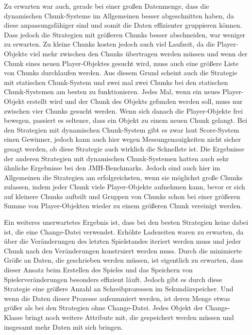 Zu erwarten war auch, gerade bei einer großen Datenmenge, dass die dynamischen Chunk-Systeme im Allgemeinen besser abgeschnitten haben, da diese anpassungsfähiger sind und somit die Daten effizienter gruppieren können. Dass jedoch die Strategien mit größeren Chunks besser abschneiden, war weniger zu erwarten. Zu kleine Chunks kosten jedoch auch viel Laufzeit, da die Player-Objekte viel mehr zwischen den Chunks übertragen werden müssen und wenn der Chunk eines neuen Player-Objektes gesucht wird, muss auch eine größere Liste von Chunks durchlaufen werden. Aus diesem Grund scheint auch die Strategie mit statischen Chunk-System und zwei mal zwei Chunks bei den statischen Chunk-Systemen am besten zu funktionieren. Jedes Mal, wenn ein neues Player-Objekt erstellt wird und der Chunk des Objekts gefunden werden soll, muss nur zwischen vier Chunks gesucht werden. Wenn sich danach die Player-Objekte frei bewegen, passiert es seltener, dass ein Objekt zu einem neuen Chunk gelangt. Bei den Strategien mit dynamischen Chunk-System gibt es zwar laut Score-System einen Gewinner, jedoch kann auch hier wegen Messungenauigkeiten nicht sicher gesagt werden, ob diese Strategie auch wirklich die Schnellste ist. Die Ergebnisse der anderen Strategien mit dynamischen Chunk-Systemen hatten auch sehr ähnliche Ergebnisse bei den JMH-Benchmarks. Jedoch sind auch hier im Allgemeinen die Strategien am erfolgreichsten, wenn sie möglichst große Chunks zulassen, indem jeder Chunk viele Player-Objekte aufnehmen kann, bevor er sich auf kleinere Chunks aufteilt und Gruppen von Chunks schon bei einer größeren Summe von Player-Objekten wieder zu einem größeren Chunk vereinigt werden.

Ein weiteres unerwartetes Ergebnis ist, dass bei den besten Strategien keine dabei ist, die eine Change-Datei verwendet. Erhöhte Ladezeiten waren zu erwarten, da über die Veränderungen des letzten Spielstandes iteriert werden muss und jeder Chunk nach den Veränderungen konstruiert werden muss. Durch die minimierte Größe an Daten, die geschrieben werden müssen, ist eigentlich zu erwarten, dass dieser Ansatz beim Erstellen des Spieles und das Speichern von Spielerveränderungen besonders effizient läuft. Jedoch gibt es durch diese Strategie eine größere Anzahl an Schreibprozessen im Sekundärspeicher. Und wenn die Daten dieser Prozesse aufsummiert werden, ist deren Menge etwas größer als bei den Strategien ohne Change-Datei. Jedes Objekt der Change-Klasse bringt noch weitere Attribute mit, die gespeichert werden müssen und insgesamt mehr Daten mit sich bringen.

